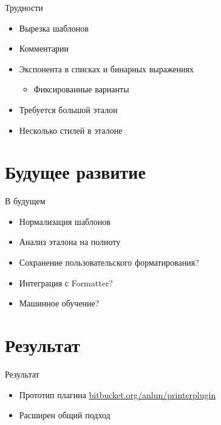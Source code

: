 \documentclass[sans]{beamer}
\begin{document}
\begin{frame}{Трудности}
	\begin{itemize}
		\item Вырезка шаблонов
		\item Комментарии
		\item Экспонента в списках и бинарных выражениях
		\begin{itemize}
			\item Фиксированные варианты
		\end{itemize}
	\end{itemize}

	\begin{itemize}
		\item Требуется большой эталон 
		\item Несколько стилей в эталоне
	\end{itemize}
\end{frame}

\section{Будущее развитие}

\begin{frame}{В будущем}
	\begin{itemize}
		\item Нормализация шаблонов
		\item Анализ эталона на полноту
		\item Сохранение пользовательского форматирования?
		\item Интеграция с Formatter?
		\item Машинное обучение?
	\end{itemize}
\end{frame}

\section{Результат}

\begin{frame}{Результат}
	\begin{itemize}
		\item Прототип плагина
			\newline
			\color{blue}\underline{\url{bitbucket.org/anlun/printerplugin}}
			\color{black}
		\item Расширен общий подход
	\end{itemize}
\end{frame}
\end{document}
